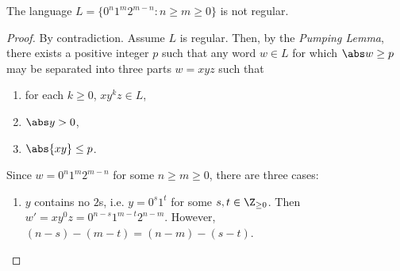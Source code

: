 \documentclass{article}
\begin{document}
\begin{claim}
	The language $L=\{0^n1^m2^{m-n}:n\geq m\geq 0\}$ is not regular.
\end{claim}
\begin{proof}
	By contradiction. Assume $L$ is regular. Then, by the \emph{Pumping Lemma},
	there exists a positive integer $p$ such that any word $w\in L$ for which
	$\abs w \geq p$ may be separated into three parts $w=xyz$ such that
	\begin{enumerate}[label=P\arabic*.]
		\item for each $k \geq 0$, $xy^kz\in L$,
		\item $\abs y > 0$,
		\item $\abs{xy}\leq p$.
	\end{enumerate}
	Since $w=0^n1^m2^{m-n}$ for some $n\geq m\geq 0$, there are three cases:
	\begin{enumerate}
		\item $y$ contains no $2$s, i.e. $y=0^s1^t$ for some $s,t\in\Z_{\geq 0}$.
		      Then $w'=xy^0z=0^{n-s}1^{m-t}2^{n-m}$. However, $(n-s)-(m-t)=(n-m)-(s-t)$.
	\end{enumerate}
\end{proof}
\end{document}
